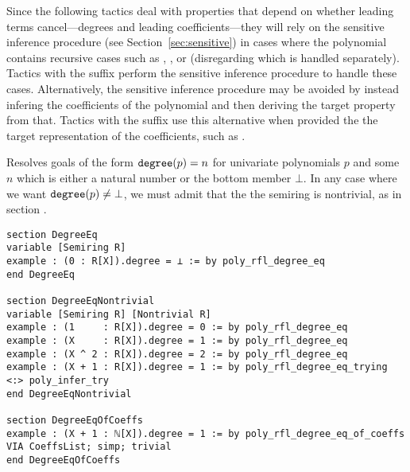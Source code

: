 Since the following tactics deal with properties that depend on whether leading terms cancel---degrees and leading coefficients---they will rely on the sensitive inference procedure (see Section~\ref{sec:sensitive}) in cases where the polynomial contains recursive cases such as \leaninline{+}, \leaninline{*}, or \leaninline{\^{}} (disregarding  which is handled separately). Tactics with the suffix  perform the sensitive inference procedure to handle these cases. Alternatively, the sensitive inference procedure may be avoided by instead infering the coefficients of the polynomial and then deriving the target property from that. Tactics with the suffix  use this alternative when provided the the target representation of the coefficients, such as .

\begin{tactic}
\label{tac:poly_rfl_degree_eq}
\leanok
{}
Resolves goals of the form $\mathtt{degree}(p) = n$ for univariate polynomials $p$ and some $n$ which is either a natural number or the bottom member $\bot$. In any case where we want $\mathtt{degree}(p) \neq \bot$, we must admit that the the semiring is nontrivial, as in section .
\begin{lstlisting}
section DegreeEq
variable [Semiring R]
example : (0 : R[X]).degree = ⊥ := by poly_rfl_degree_eq
end DegreeEq

section DegreeEqNontrivial
variable [Semiring R] [Nontrivial R]
example : (1     : R[X]).degree = 0 := by poly_rfl_degree_eq
example : (X     : R[X]).degree = 1 := by poly_rfl_degree_eq
example : (X ^ 2 : R[X]).degree = 2 := by poly_rfl_degree_eq
example : (X + 1 : R[X]).degree = 1 := by poly_rfl_degree_eq_trying <:> poly_infer_try
end DegreeEqNontrivial

section DegreeEqOfCoeffs
example : (X + 1 : ℕ[X]).degree = 1 := by poly_rfl_degree_eq_of_coeffs VIA CoeffsList; simp; trivial
end DegreeEqOfCoeffs
\end{lstlisting}
\end{tactic}

